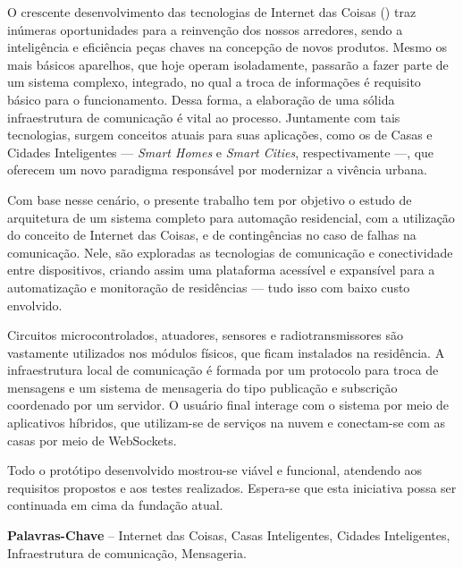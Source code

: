 \begin{resumo}
O crescente desenvolvimento das tecnologias de Internet das Coisas (\wiot) traz inúmeras oportunidades para a reinvenção dos nossos arredores, sendo a inteligência e eficiência peças chaves na concepção de novos produtos. Mesmo os mais básicos aparelhos, que hoje operam isoladamente, passarão a fazer parte de um sistema complexo, integrado, no qual a troca de informações é requisito básico para o funcionamento. Dessa forma, a elaboração de uma sólida infraestrutura de comunicação é vital ao processo. Juntamente com tais tecnologias, surgem conceitos atuais para suas aplicações, como os de Casas e Cidades Inteligentes --- \textit{Smart Homes} e \textit{Smart Cities}, respectivamente ---, que oferecem um novo paradigma responsável por modernizar a vivência urbana.

Com base nesse cenário, o presente trabalho tem por objetivo o estudo de arquitetura de um sistema completo para automação residencial, com a utilização do conceito de Internet das Coisas, e de contingências no caso de falhas na comunicação. Nele, são exploradas as tecnologias de comunicação e conectividade entre dispositivos, criando assim uma plataforma acessível e expansível para a automatização e monitoração de residências --- tudo isso com baixo custo envolvido.

Circuitos microcontrolados, atuadores, sensores e radiotransmissores são vastamente utilizados nos módulos físicos, que ficam instalados na residência. A infraestrutura local de comunicação é formada por um protocolo para troca de mensagens e um sistema de mensageria do tipo publicação e subscrição coordenado por um servidor. O usuário final interage com o sistema por meio de aplicativos híbridos, que utilizam-se de serviços na nuvem e conectam-se com as casas por meio de WebSockets.

Todo o protótipo desenvolvido mostrou-se viável e funcional, atendendo aos requisitos propostos e aos testes realizados. Espera-se que esta iniciativa possa ser continuada em cima da fundação atual.

%
\textbf{Palavras-Chave} -- Internet das Coisas, Casas Inteligentes, Cidades Inteligentes, Infraestrutura de comunicação, Mensageria.
\end{resumo}
